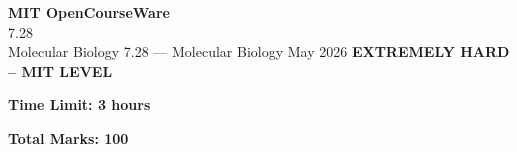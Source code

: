 \documentclass[12pt,a4paper]{exam}
\begin{document}
\begin{center}
{\LARGE \textbf{MIT OpenCourseWare}}\\7.28\\Molecular Biology
\vspace{0.5cm}
{7.28} --- {Molecular Biology}
\vspace{0.3cm}
May 2026
\vspace{0.3cm}
\textbf{EXTREMELY HARD -- MIT LEVEL}
\end{center}

\begin{center}
\textbf{Time Limit: 3 hours}
\end{center}

\begin{center}
\textbf{Total Marks: 100}
\end{center}

\vspace{0.5cm}
\end{document}
